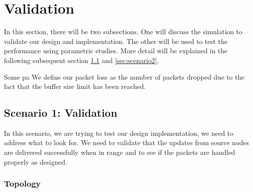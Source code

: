 %

\chapter{Validation} %

In this section, there will be two subsections.  One will discuss the simulation to validate our design and implementation.  
The other will be used to test the performance using parametric studies.  
More detail will be explained in the following subsequent section \ref{sec:scenario1} and \ref{sec:scenario2}.

Some pa
We define our packet loss as the number of packets dropped due to the fact that the buffer size limit has been reached.



\section{Scenario 1: Validation}
\label{sec:scenario1}

In this scenario, we are trying to test our design implementation, we need to address what to look for.  
We need to validate that the updates from source nodes are delivered successfully when in range and to see if the packets are handled properly as designed.  

\subsection{Topology}


